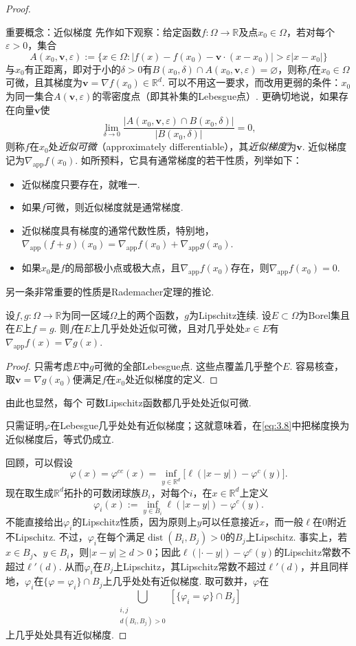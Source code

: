 \begin{proof}
\begin{sourcebox}{重要概念：近似梯度}
先作如下观察：给定函数$f:\Omega\to\mathbb R$及点$x_0\in\Omega$，若对每个$\varepsilon>0$，集合
\[
A(x_0,\mathbf v,\varepsilon):=\{x\in\Omega:|f(x)-f(x_0)-\mathbf v\cdot(x-x_0)|>\varepsilon|x-x_0|\}
\]
与$x_0$有正距离，即对于小的$\delta>0$有$B(x_0,\delta)\cap A(x_0,\mathbf v,\varepsilon)=\varnothing$，则称$f$在$x_0\in\Omega$可微，且其梯度为$\mathbf v=\nabla f(x_0)\in\mathbb R^d$. 可以不用这一要求，而改用更弱的条件：$x_0$为同一集合$A(\mathbf v,\varepsilon)$的零密度点（即其补集的Lebesgue点）. 更确切地说，如果存在向量$\mathbf v$使
\[
\lim_{\delta\to0}\frac{|A(x_0,\mathbf v,\varepsilon)\cap B(x_0,\delta)|}{|B(x_0,\delta)|}=0,
\]
则称$f$在$x_0$处\emph{近似可微}（approximately differentiable），其\emph{近似梯度}为$\mathbf v$. 近似梯度记为$\nabla_{\mathrm{app}}f(x_0)$. 如所预料，它具有通常梯度的若干性质，列举如下：
\begin{itemize}
\item 近似梯度只要存在，就唯一.
\item 如果$f$可微，则近似梯度就是通常梯度.
\item 近似梯度具有梯度的通常代数性质，特别地，$\nabla_{\mathrm{app}}(f+g)(x_0)=\nabla_{\mathrm{app}}f(x_0)+\nabla_{\mathrm{app}}g(x_0)$.
\item 如果$x_0$是$f$的局部极小点或极大点，且$\nabla_{\mathrm{app}}f(x_0)$存在，则$\nabla_{\mathrm{app}}f(x_0)=0$.
\end{itemize}
另一条非常重要的性质是Rademacher定理的推论.
\begin{proposition*}
设$f,g:\Omega\to\mathbb R$为同一区域$\Omega$上的两个函数，$g$为Lipschitz连续. 设$E\subset\Omega$为Borel集且在$E$上$f=g$. 则$f$在$E$上几乎处处近似可微，且对几乎处处$x\in E$有$\nabla_{\mathrm{app}}f(x)=\nabla g(x)$.
\end{proposition*}
\begin{proof}
只需考虑$E$中$g$可微的全部Lebesgue点. 这些点覆盖几乎整个$E$. 容易核查，取$\mathbf v=\nabla g(x_0)$便满足$f$在$x_0$处近似梯度的定义.
\end{proof}
由此也显然，每个\label{idx:i30-p117}
可数Lipschitz函数都几乎处处近似可微.
\end{sourcebox}

只需证明$\varphi$在Lebesgue几乎处处有近似梯度；这就意味着，在\eqref{eq:3.8}中把梯度换为近似梯度后，等式仍成立.

回顾，可以假设
\[
\varphi(x)=\varphi^{cc}(x)=\inf_{y\in\mathbb R^d}\bigl[\ell(|x-y|)-\varphi^c(y)\bigr].
\]
现在取生成$\mathbb R^d$拓扑的可数闭球族$B_i$，对每个$i$，在$x\in\mathbb R^d$上定义
\[
\varphi_i(x):=\inf_{y\in B_i}\ell(|x-y|)-\varphi^c(y).
\]
不能直接给出$\varphi_i$的Lipschitz性质，因为原则上$y$可以任意接近$x$，而一般$\ell$在$0$附近不Lipschitz. 不过，$\varphi_i$在每个满足$\operatorname{dist}(B_i,B_j)>0$的$B_j$上Lipschitz. 事实上，若$x\in B_j$、$y\in B_i$，则$|x-y|\ge d>0$；因此$\ell(|\cdot-y|)-\varphi^c(y)$的Lipschitz常数不超过$\ell'(d)$. 从而$\varphi_i$在$B_j$上Lipschitz，其Lipschitz常数不超过$\ell'(d)$，并且同样地，$\varphi_i$在$\{\varphi=\varphi_i\}\cap B_j$上几乎处处有近似梯度. 取可数并，$\varphi$在
\[
\bigcup_{\substack{i,j\\d(B_i,B_j)>0}}[\{\varphi_i=\varphi\}\cap B_j]
\]
上几乎处处具有近似梯度.


\end{proof}
